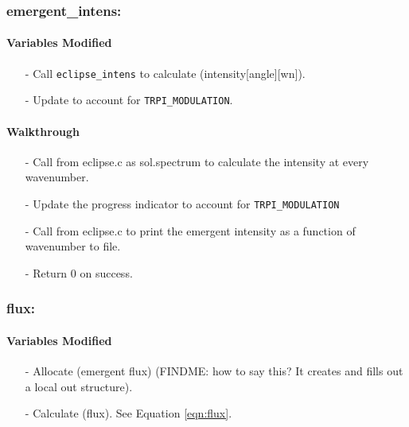 \documentclass[letterpaper,12pt]{article}
\begin{document}
\subsubsection{emergent\_intens:}
\paragraph{Variables Modified}
\begin{enumerate}[leftmargin=10pt, noitemsep, parsep=0pt, topsep=0ex]
\item[-] Call {\tt eclipse\_intens} to calculate  (intensity[angle][wn]).
\item[-] Update  to account for {\tt TRPI\_MODULATION}.
\end{enumerate}

\noindent
\paragraph{Walkthrough}
\begin{enumerate}[leftmargin=10pt, noitemsep, parsep=0pt, topsep=0ex]
\item[-] Call  from eclipse.c as sol.spectrum to calculate the intensity at every wavenumber.
\item[-] Update the progress indicator to account for {\tt TRPI\_MODULATION}
\item[-] Call  from eclipse.c to print the emergent intensity as a function of wavenumber to file.
\item[-] Return 0 on success.
\end{enumerate}

\subsubsection{flux:}
\paragraph{Variables Modified}
\begin{enumerate}[leftmargin=10pt, noitemsep, parsep=0pt, topsep=0ex]
\item[-] Allocate  (emergent flux) (FINDME: how to say this? It creates and fills out a local out structure).
\item[-] Calculate  (flux). See Equation \ref{eqn:flux}.
\end{enumerate}
\end{document}
